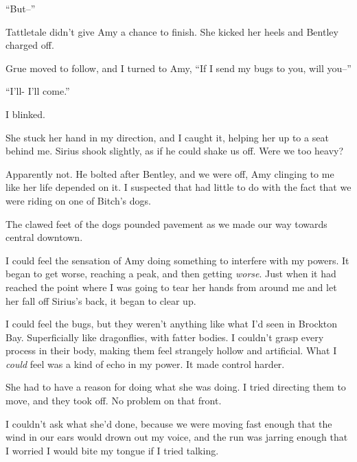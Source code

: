 ``But--''



Tattletale didn't give Amy a chance to finish.  She kicked her heels and Bentley charged off.



Grue moved to follow, and I turned to Amy, ``If I send my bugs to you, will you--''



``I'll-  I'll come.''



I blinked.



She stuck her hand in my direction, and I caught it, helping her up to a seat behind me.  Sirius shook slightly, as if he could shake us off.  Were we too heavy?



Apparently not.  He bolted after Bentley, and we were off, Amy clinging to me like her life depended on it.  I suspected that had little to do with the fact that we were riding on one of Bitch's dogs.



The clawed feet of the dogs pounded pavement as we made our way towards central downtown.



I could feel the sensation of Amy doing something to interfere with my powers.  It began to get worse, reaching a peak, and then getting \emph{worse}.  Just when it had reached the point where I was going to tear her hands from around me and let her fall off Sirius's back, it began to clear up.



I could feel the bugs, but they weren't anything like what I'd seen in Brockton Bay.  Superficially like dragonflies, with fatter bodies.  I couldn't grasp every process in their body, making them feel strangely hollow and artificial.  What I \emph{could} feel was a kind of echo in my power.  It made control harder.



She had to have a reason for doing what she was doing.  I tried directing them to move, and they took off.  No problem on that front.



I couldn't ask what she'd done, because we were moving fast enough that the wind in our ears would drown out my voice, and the run was jarring enough that I worried I would bite my tongue if I tried talking.



